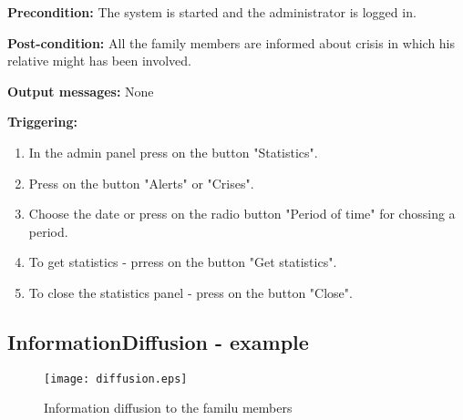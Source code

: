\begin{description}
	\item \textbf{Precondition:} The system is started and the administrator is
	logged in.
	\item \textbf{Post-condition:} All the family members are informed about crisis
	in which his relative might has been involved.
	\item \textbf{Output messages:} None
	
	\item \textbf{Triggering:}
	
	\begin{enumerate}
		\item In the admin panel press on the button "Statistics".
		\item Press on the button "Alerts" or "Crises".
		\item Choose the date or press on the radio button "Period of time" for
		chossing a period.
		\item To get statistics - prress on the button "Get statistics".
		\item To close the statistics panel - press on the button "Close".
	\end{enumerate}
\end{description}
\subsection{InformationDiffusion - example}

\begin{figure}[h]
    \texttt{[image: diffusion.eps]}
	\caption{Information diffusion to the familu members}
\end{figure}

